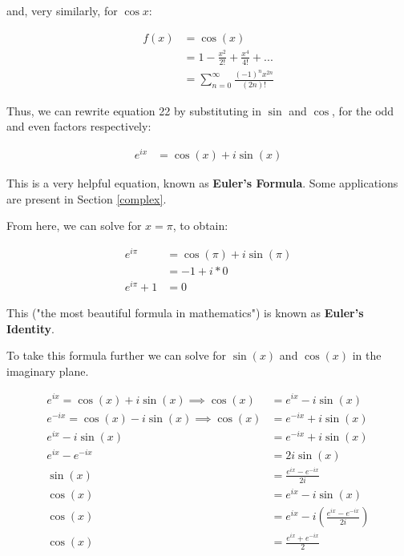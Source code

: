 \documentclass[12pt]{article}
\begin{document}
and, very similarly, for $\cos x$:

\begin{equation}
    \begin{split}
        f(x) &= \cos(x) \\
        &= 1 - \frac{x^2}{2!} + \frac{x^4}{4!} + ...\\
        &= \sum_{n=0}^{\infty} \frac{(-1)^n x^{2n}}{(2n)!}
    \end{split}
\end{equation}

Thus, we can rewrite equation 22 by substituting in $\sin$ and $\cos$, for the odd and even factors respectively:

\begin{equation}
    \begin{split}
        e^{ix} &= \cos(x) + i\sin(x)
    \end{split}
\end{equation}

This is a very helpful equation, known as \textbf{Euler's Formula}. Some applications are present in Section \ref{complex}.

From here, we can solve for $x=\pi$, to obtain:

\begin{equation}
    \begin{split}
        e^{i\pi} &= \cos(\pi) + i \sin(\pi)\\
        &= -1 + i*0\\
        e^{i\pi}+1 &= 0
    \end{split}
\end{equation}

This ("the most beautiful formula in mathematics") is known as \textbf{Euler's Identity}.

To take this formula further we can solve for $\sin(x)$ and $\cos(x)$ in the imaginary plane. 

\begin{equation}
    \begin{split}
        e^{ix} = \cos(x) + i\sin(x) \implies \cos(x) &= e^{ix} - i\sin(x)\\
        e^{-ix} = \cos(x) - i\sin(x) \implies \cos(x) &= e^{-ix} +i\sin(x)\\
        e^{ix} - i\sin(x) &= e^{-ix} + i\sin(x)\\
        e^{ix}-e^{-ix} &= 2i\sin(x)\\
        \sin(x) &= \frac{e^{ix}-e^{-ix}}{2i}\\
        \cos(x) &= e^{ix}-i\sin(x)\\
        \cos(x) &=e^{ix}-i(\frac{e^{ix}-e^{-ix}}{2i})\\
        \cos(x) &= \frac{e^{ix}+e^{-ix}}{2}\\
    \end{split}
\end{equation}
\end{document}
